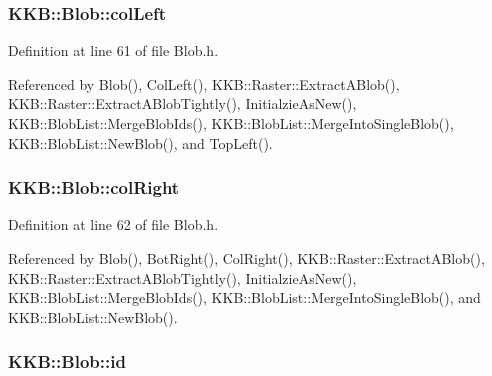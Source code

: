 \subsubsection[{\texorpdfstring{col\+Left}{colLeft}}]{ K\+K\+B\+::\+Blob\+::col\+Left}\hypertarget{class_k_k_b_1_1_blob_a1d47c1a8131e60211a3dd91910699318}{}\label{class_k_k_b_1_1_blob_a1d47c1a8131e60211a3dd91910699318}


Definition at line 61 of file Blob.\+h.



Referenced by Blob(), Col\+Left(), K\+K\+B\+::\+Raster\+::\+Extract\+A\+Blob(), K\+K\+B\+::\+Raster\+::\+Extract\+A\+Blob\+Tightly(), Initialzie\+As\+New(), K\+K\+B\+::\+Blob\+List\+::\+Merge\+Blob\+Ids(), K\+K\+B\+::\+Blob\+List\+::\+Merge\+Into\+Single\+Blob(), K\+K\+B\+::\+Blob\+List\+::\+New\+Blob(), and Top\+Left().

\subsubsection[{\texorpdfstring{col\+Right}{colRight}}]{ K\+K\+B\+::\+Blob\+::col\+Right}\hypertarget{class_k_k_b_1_1_blob_a3786c83aeb9b92bc076c14afcc99c463}{}\label{class_k_k_b_1_1_blob_a3786c83aeb9b92bc076c14afcc99c463}


Definition at line 62 of file Blob.\+h.



Referenced by Blob(), Bot\+Right(), Col\+Right(), K\+K\+B\+::\+Raster\+::\+Extract\+A\+Blob(), K\+K\+B\+::\+Raster\+::\+Extract\+A\+Blob\+Tightly(), Initialzie\+As\+New(), K\+K\+B\+::\+Blob\+List\+::\+Merge\+Blob\+Ids(), K\+K\+B\+::\+Blob\+List\+::\+Merge\+Into\+Single\+Blob(), and K\+K\+B\+::\+Blob\+List\+::\+New\+Blob().

\subsubsection[{\texorpdfstring{id}{id}}]{ K\+K\+B\+::\+Blob\+::id}\hypertarget{class_k_k_b_1_1_blob_af752299192d447637bd6c56d4b1e0660}{}\label{class_k_k_b_1_1_blob_af752299192d447637bd6c56d4b1e0660}


